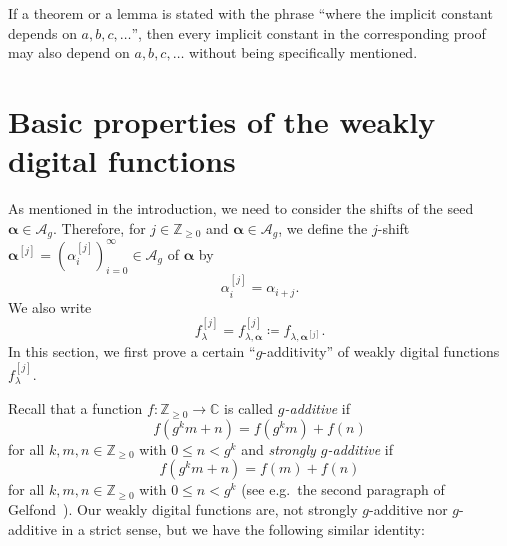 \documentclass[hidelinks]{amsart}
\numberwithin{equation}{section}
\theoremstyle{plain}
\theoremstyle{definition}
\begin{document}
If a theorem or a lemma is stated
with the phrase ``where the implicit constant depends on $a,b,c,\ldots$'',
then every implicit constant in the corresponding proof
may also depend on $a,b,c,\ldots$ without being specifically mentioned.

\section{Basic properties of the weakly digital functions}
\label{sec:basic_wdf}
As mentioned in the introduction, we need to consider the shifts of the seed $\bm{\alpha}\in\mathscr{A}_{g}$.
Therefore, for $j\in\mathbb{Z}_{\ge0}$ and $\bm{\alpha}\in\mathscr{A}_{g}$,
we define the $j$-shift $\bm{\alpha}^{[j]}=(\alpha_{i}^{[j]})_{i=0}^{\infty}\in\mathscr{A}_{g}$ of $\bm{\alpha}$ by
\[
\alpha_{i}^{[j]}=\alpha_{i+j}.
\]
We also write
\[
f_{\lambda}^{[j]}
=
f_{\lambda,\bm{\alpha}}^{[j]}
\coloneqq
f_{\lambda,\bm{\alpha}^{[j]}}.
\]
In this section, we first prove a certain ``$g$-additivity'' of weakly digital functions $f_{\lambda}^{[j]}$.

Recall that a function $f\colon\mathbb{Z}_{\ge0}\to\mathbb{C}$ is called \textsl{$g$-additive} if
\[
f(g^{k}m+n)
=
f(g^{k}m)
+
f(n)
\]
for all $k,m,n\in\mathbb{Z}_{\ge0}$ with $0\le n<g^{k}$ and \textsl{strongly $g$-additive} if
\[
f(g^{k}m+n)
=
f(m)
+
f(n)
\]
for all $k,m,n\in\mathbb{Z}_{\ge0}$ with $0\le n<g^{k}$ 
(see e.g.~the second paragraph of Gelfond~\cite{Gelfond}).
Our weakly digital functions are, not strongly $g$-additive nor $g$-additive in a strict sense,
but we have the following similar identity:
\end{document}
